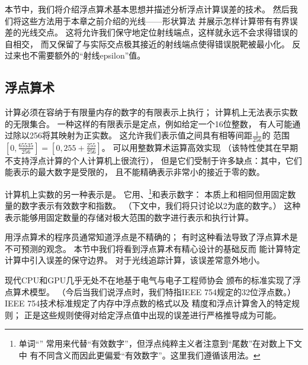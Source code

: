 本节中，我们将介绍浮点算术基本思想并描述分析浮点计算误差的技术。
然后我们将这些方法用于本章之前介绍的光线——形状算法
并展示怎样计算带有有界误差的光线交点。
这将允许我们保守地定位射线端点，这样就永远不会求得错误的自相交，
而又保留了与实际交点极其接近的射线端点使得错误脱靶被最小化。
反过来也不需要额外的“射线epsilon”值。

\subsection{浮点算术}\label{sub:浮点算术}
计算必须在容纳于有限量内存的数字的有限表示上执行；
计算机上无法表示实数的无限集合。
一种这样的有限表示是定点，例如给定一个16位整数，
有人可能通过除以256将其映射为正实数。
这允许我们表示值之间具有相等间距$\displaystyle\frac{1}{256}$的
范围$\displaystyle\left[0,\frac{65535}{256}\right]=\left[0,255+\frac{255}{256}\right]$。
可以用整数算术运算高效实现
（该特性使其在早期不支持浮点计算的个人计算机上很流行），
但是它们受制于许多缺点：其中，它们能表示的最大数字是受限的，
且不能精确表示非常小的接近于零的数。

计算机上实数的另一种表示是。
它用、\footnote{单词“\protect{}”
    常用来代替“有效数字”，但浮点纯粹主义者注意到“尾数”在对数上下文中
    有不同含义而因此更偏爱“有效数字”。这里我们遵循该用法。}和表示数字：
本质上和相同但用固定数量的数字表示有效数字和指数。
（下文中，我们将只讨论以2为底的数字。）
这种表示能够用固定数量的存储对极大范围的数字进行表示和执行计算。

用浮点算术的程序员通常知道浮点是不精确的；
有时这种看法导致了浮点算术是不可预测的观念。
本节中我们将看到浮点算术有精心设计的基础反而
能计算特定计算中引入误差的保守边界。
对于光线追踪计算，该误差常意外地小。

现代CPU和GPU几乎无处不在地基于电气与电子工程师协会
颁布的标准\parencite*{10.1109/IEEESTD.1985.82928,10.1109/IEEESTD.2008.4610935}实现了浮点算术模型。
（今后当我们说浮点时，我们特指IEEE 754规定的32位浮点数。）
IEEE 754技术标准规定了内存中浮点数的格式以及
精度和浮点计算舍入的特定规则；
正是这些规则使得对给定浮点值中出现的误差进行严格推导成为可能。

